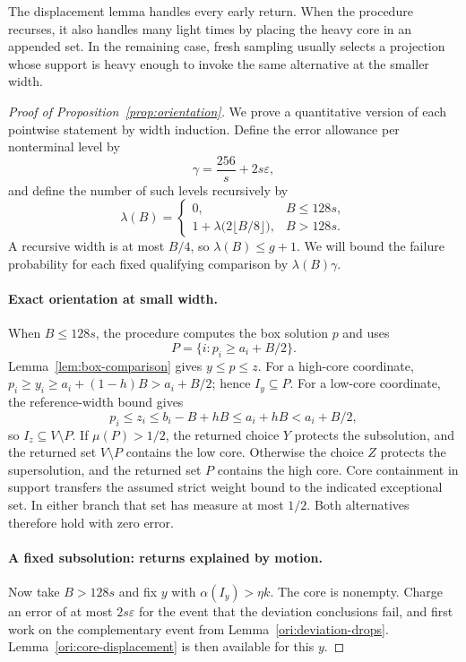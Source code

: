 The displacement lemma handles every early return. When the procedure
recurses, it also handles many light times by placing the heavy core
in an appended set. In the remaining case, fresh sampling usually
selects a projection whose support is heavy enough to invoke the
same alternative at the smaller width.

\begin{proof}[Proof of Proposition~\ref{prop:orientation}]
We prove a quantitative version of each pointwise statement by width
induction. Define the error allowance per nonterminal level by
\[
  \gamma=\frac{256}{s}+2s\varepsilon,
\]
and define the number of such levels recursively by
\[
  \lambda(B)=
  \begin{cases}
    0,&B\leq128s,\\
    1+\lambda\bigl(2\lfloor B/8\rfloor\bigr),&B>128s.
  \end{cases}
\]
A recursive width is at most \(B/4\), so \(\lambda(B)\leq g+1\).
We will bound the failure probability for each fixed qualifying
comparison by \(\lambda(B)\gamma\).

\paragraph{Exact orientation at small width.}
When \(B\leq128s\), the procedure computes the box solution \(p\)
and uses
\[
  P=\{i:p_i\geq a_i+B/2\}.
\]
Lemma~\ref{lem:box-comparison} gives \(y\leq p\leq z\). For a high-core
coordinate,
\(p_i\geq y_i\geq a_i+(1-h)B>a_i+B/2\); hence \(I_y\subseteq P\).
For a low-core coordinate, the reference-width bound gives
\[
  p_i\leq z_i\leq b_i-B+hB\leq a_i+hB<a_i+B/2,
\]
so \(I_z\subseteq V\setminus P\).
If \(\mu(P)>1/2\), the returned choice \(Y\) protects the
subsolution, and the returned set \(V\setminus P\) contains the low
core. Otherwise the choice \(Z\) protects the supersolution, and
the returned set \(P\) contains the high core. Core containment in
support transfers the assumed strict weight bound to the indicated
exceptional set. In either branch that set has measure at most
\(1/2\). Both alternatives therefore hold with zero error.

\paragraph{A fixed subsolution: returns explained by motion.}
Now take \(B>128s\) and fix \(y\) with \(\alpha(I_y)>\eta k\).
The core is nonempty. Charge an error of at most \(2s\varepsilon\)
for the event that the deviation conclusions fail, and first work on
the complementary event from Lemma~\ref{ori:deviation-drops}.
Lemma~\ref{ori:core-displacement} is then available for this \(y\).


\end{proof}
